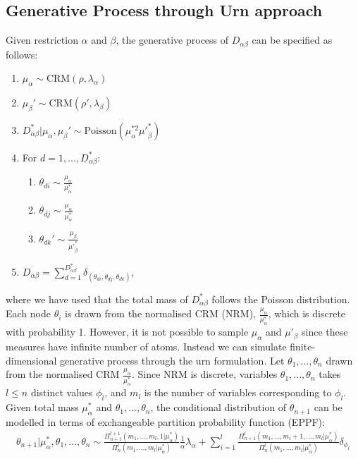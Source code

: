 \documentclass{article}
\begin{document}
\subsection{Generative Process through Urn approach}
Given restriction $\alpha$ and $\beta$, the generative process of $D_{\alpha\beta}$ can be specified as follows:
\begin{enumerate}
\item $\mu_\alpha \sim \text{CRM}(\rho, \lambda_\alpha)$
\item $\mu_\beta' \sim \text{CRM}(\rho', \lambda_\beta)$
\item $D_{\alpha\beta}^* | \mu_\alpha, \mu_\beta' \sim \text{Poisson}(\mu_\alpha^{*2}{\mu'}_\beta^{*})$
\item For $d=1,...,D_{\alpha\beta}^*$:
\begin{enumerate}
\item $\theta_{di} \sim \frac{\mu_\alpha}{\mu_\alpha^*}$
\item $\theta_{dj} \sim \frac{\mu_\alpha}{\mu_\alpha^*}$
\item $\theta_{dk}' \sim \frac{\mu_\beta}{{\mu'}_\beta^{*}}$
\end{enumerate}
\item $D_{\alpha\beta} = \sum_{d=1}^{D_{\alpha\beta}^*} \delta_{(\theta_{di}, \theta_{dj}, \theta_{dk})}$,
\end{enumerate}
where we have used that the total mass of $D_{\alpha\beta}^*$ follows the Poisson distribution. Each node $\theta_i$ is drawn from the normalised CRM (NRM), $\frac{\mu_\alpha}{\mu_\alpha^*}$, which is discrete with probability 1. However, it is not possible to sample $\mu_\alpha$ and $\mu'_\beta$ since these measures have infinite number of atoms. Instead we can simulate finite-dimensional generative process through the urn formulation. Let $\theta_1, ..., \theta_n$ drawn from the normalised CRM $\frac{\mu_\alpha}{\mu_\alpha^*}$. Since NRM is discrete, variables $\theta_1, ..., \theta_n$ takes $l \leq n$ distinct values $\phi_l$, and $m_l$ is the number of variables corresponding to $\phi_l$.
Given total mass $\mu_\alpha^*$ and $\theta_1, ..., \theta_n$, the conditional distribution of $\theta_{n+1}$ can be modelled in terms of exchangeable partition probability function (EPPF):
\begin{align}
\label{eqn:eppf}
\theta_{n+1} | \mu_\alpha^*, \theta_1,...,\theta_n \sim \frac{\Pi_{n+1}^{l+1}(m_1, ..., m_l, 1 | \mu_\alpha^*)}{\Pi_{n}^{l}(m_1, ..., m_l | \mu_\alpha^*)} \frac{1}{\alpha} \lambda_\alpha
+ \sum_{i=1}^{l}\frac{\Pi_{n+1}^{l}(m_1, ..., m_{i}+1, ..., m_l | \mu_\alpha^*)}{\Pi_{n}^{l}(m_1, ..., m_l| \mu_\alpha^*)} \delta_{\phi_l}
\end{align}
\end{document}
